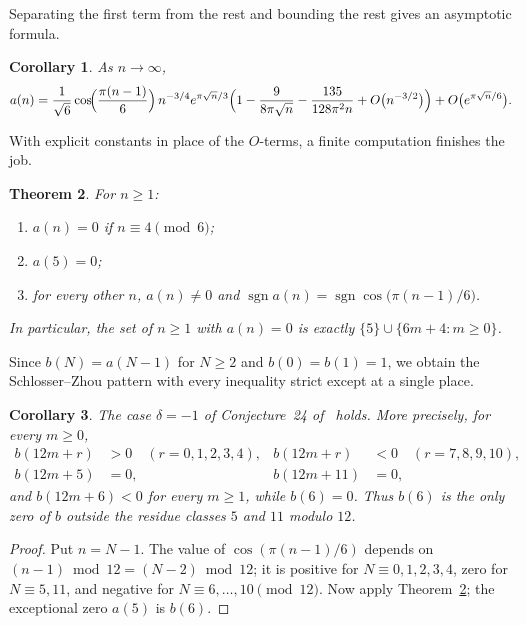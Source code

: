 \documentclass[11pt]{amsart}
\numberwithin{equation}{section}
\newtheorem{theorem}{Theorem}[section]
\newtheorem{corollary}[theorem]{Corollary}
\theoremstyle{definition}
\theoremstyle{remark}
\newcommand{\sgn}{\operatorname{sgn}}
\begin{document}
Separating the first term from the rest and bounding the rest gives an asymptotic formula.

\begin{corollary}\label{cor:asymp}
As $n\to\infty$,
\begin{equation}\label{eq:asymp}
a(n)=\frac{1}{\sqrt6}\cos\!\Bigl(\frac{\pi(n-1)}{6}\Bigr)\,n^{-3/4}e^{\pi\sqrt n/3}
\Bigl(1-\frac{9}{8\pi\sqrt n}-\frac{135}{128\pi^2 n}+O\bigl(n^{-3/2}\bigr)\Bigr)+O\bigl(e^{\pi\sqrt n/6}\bigr).
\end{equation}
\end{corollary}

With explicit constants in place of the $O$-terms, a finite computation finishes the job.

\begin{theorem}\label{thm:signs}
For $n\ge1$:
\begin{enumerate}[label=\textup{(\roman*)}]
\item $a(n)=0$ if $n\equiv4\pmod6$;
\item $a(5)=0$;
\item for every other $n$, $a(n)\neq0$ and $\sgn a(n)=\sgn\cos\bigl(\pi(n-1)/6\bigr)$.
\end{enumerate}
In particular, the set of $n\ge1$ with $a(n)=0$ is exactly $\{5\}\cup\{6m+4: m\ge0\}$.
\end{theorem}

Since $b(N)=a(N-1)$ for $N\ge2$ and $b(0)=b(1)=1$, we obtain the Schlosser--Zhou pattern with every inequality strict except at a single place.

\begin{corollary}\label{cor:SZ}
The case $\delta=-1$ of Conjecture~24 of~\cite{SZ} holds. More precisely, for every $m\ge0$,
\begin{align*}
b(12m+r)&>0\quad (r=0,1,2,3,4), & b(12m+r)&<0\quad (r=7,8,9,10),\\
b(12m+5)&=0, & b(12m+11)&=0,
\end{align*}
and $b(12m+6)<0$ for every $m\ge1$, while $b(6)=0$. Thus $b(6)$ is the only zero of $b$ outside the residue classes $5$ and $11$ modulo $12$.
\end{corollary}

\begin{proof}
Put $n=N-1$. The value of $\cos(\pi(n-1)/6)$ depends on $(n-1)\bmod 12=(N-2)\bmod12$; it is positive for $N\equiv0,1,2,3,4$, zero for $N\equiv5,11$, and negative for $N\equiv6,\dots,10\pmod{12}$. Now apply Theorem~\ref{thm:signs}; the exceptional zero $a(5)$ is $b(6)$.
\end{proof}
\end{document}
